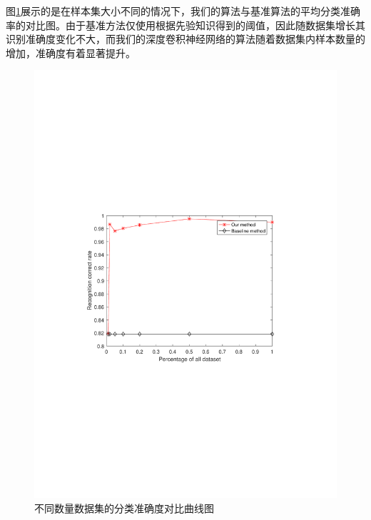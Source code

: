 图\ref{fig:sizes}展示的是在样本集大小不同的情况下，我们的算法与基准算法的平均分类准确率的对比图。由于基准方法仅使用根据先验知识得到的阈值，因此随数据集增长其识别准确度变化不大，而我们的深度卷积神经网络的算法随着数据集内样本数量的增加，准确度有着显著提升。
\begin{figure}[!t]
	\centering
	\includegraphics[width=\textwidth]{figures/sizes}
	\caption{不同数量数据集的分类准确度对比曲线图}
	\label{fig:sizes}
\end{figure}

